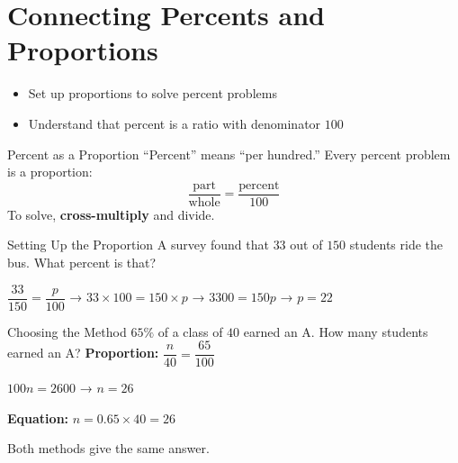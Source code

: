 \section{Connecting Percents and Proportions}

\begin{learningGoals}
\begin{itemize}
    \item Set up proportions to solve percent problems
    \item Understand that percent is a ratio with denominator $100$
\end{itemize}
\end{learningGoals}

\begin{conceptBox}{Percent as a Proportion}
``Percent'' means ``per hundred.'' Every percent problem is a proportion:
$$\frac{\text{part}}{\text{whole}} = \frac{\text{percent}}{100}$$
To solve, \textbf{cross-multiply} and divide.
\end{conceptBox}

\begin{workedExample}{Setting Up the Proportion}
A survey found that $33$ out of $150$ students ride the bus. What percent is that?

$\dfrac{33}{150} = \dfrac{p}{100}$ → $33 \times 100 = 150 \times p$ → $3300 = 150p$ → $p = 22$
\end{workedExample}

\begin{sideBySideExample}{Choosing the Method}
$65\%$ of a class of $40$ earned an A. How many students earned an A?
\tcblower
\textbf{Proportion:} $\dfrac{n}{40} = \dfrac{65}{100}$

$100n = 2600$ → $n = 26$

\textbf{Equation:} $n = 0.65 \times 40 = 26$ \checkmark

Both methods give the same answer.
\end{sideBySideExample}


